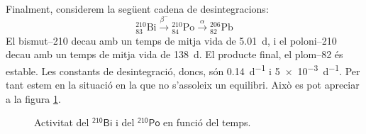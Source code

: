 \documentclass[12pt,a4paper]{article}
\begin{document}
Finalment, considerem la següent cadena de desintegracions:
\begin{equation*}
	{}^{210}_{83}\text{Bi} \xrightarrow{\beta^-} {}^{210}_{84}\text{Po} \xrightarrow{\alpha} {}^{206}_{82}\text{Pb}
\end{equation*}
El bismut--210 decau amb un temps de mitja vida de \SI{5.01}{d}, i el poloni--210 decau amb un temps de mitja vida de \SI{138}{d}. El producte final, el plom--82 és estable. Les constants de desintegració, doncs, són \SI{0,14}{d^{-1}} i \SI{5e-3}{d^{-1}}. Per tant estem en la situació en la que no s'assoleix un equilibri. Això es pot apreciar a la figura \ref{fig:no equilibri}.

\begin{figure}
	\center
	
	\caption{Activitat del \( \mathsf{{}^{210}\text{Bi}} \) i del \( \mathsf{{}^{210}\text{Po}} \) en funció del temps.}
	\label{fig:no equilibri}
\end{figure}
\end{document}
